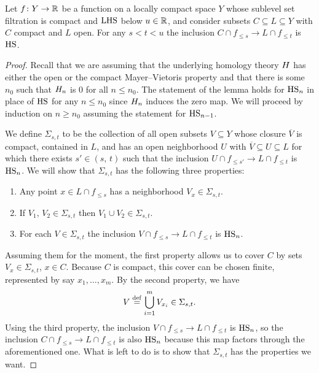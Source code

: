 \begin{lem} \label{l:key lemma for q-tameness}
	Let $f \colon Y \to \mathbb{R}$ be a function on a locally compact space $Y$ whose sublevel set filtration is compact and $\mathrm{LHS}$ below $u \in \mathbb{R}$, and consider subsets $C \subseteq L \subseteq Y$ with $C$ compact and $L$ open.
	For any $s < t < u$ the inclusion $C \cap f_{\leq s} \to L \cap f_{\leq t}$ is $\mathrm{HS}$.
\end{lem}

\begin{proof}
	Recall that we are assuming that the underlying homology theory $H$ has either the open or the compact Mayer--Vietoris property and that there is some $n_0$ such that $H_{n}$ is 0 for all $n \leq n_0$.
	The statement of the lemma holds for $\mathrm{HS}_{n}$ in place of $\mathrm{HS}$ for any $n \leq n_0$ since $H_{n}$ induces the zero map.
	We will proceed by induction on $n \geq n_0$ assuming the statement for $\mathrm{HS}_{n-1}$.

	We define $\Sigma_{s, t}$ to be the collection of all open subsets $V \subseteq Y$ whose closure $\overline{V}$ is compact, contained in $L$, and has an open neighborhood $U$ with $\overline{V} \subseteq U \subseteq L$	for which there exists $s' \in (s,\, t)$ such that the inclusion $U \cap f_{\leq s'} \to L \cap f_{\leq t}$ is $\mathrm{HS}_n$.
	We will show that $\Sigma_{s, t}$ has the following three properties:
	\begin{enumerate}
		\item Any point $x \in L \cap f_{\leq s}$ has a neighborhood $V_x \in \Sigma_{s,t}$.
		\item If $V_1,\, V_2 \in \Sigma_{s,t}$ then $V_1 \cup V_2 \in \Sigma_{s,t}$.
		\item For each $V \in \Sigma_{s,t}$ the inclusion
		$V \cap f_{\leq s} \to L \cap f_{\leq t}$ is $\mathrm{HS}_n$.
	\end{enumerate}

	Assuming them for the moment, the first property allows us to cover $C$ by sets $V_x \in \Sigma_{s,t}$, $x \in C$.
	Because $C$ is compact, this cover can be chosen finite, represented by say $x_1,\dots, x_m$.
	By the second property, we have
	\[V \stackrel{\mathrm{def}}{=} \bigcup_{i = 1}^m V_{x_i} \in \Sigma_{s,t}.\]
	Using the third property, the inclusion
	$V \cap f_{\leq s} \to L \cap f_{\leq t}$
	is $\mathrm{HS}_n$, so the inclusion
	$C \cap f_{\leq s} \to L \cap f_{\leq t}$
	is also $\mathrm{HS}_n$ because this map factors through the aforementioned one.
	What is left to do is to show that $\Sigma_{s,t}$ has the properties we want.


\end{proof}
